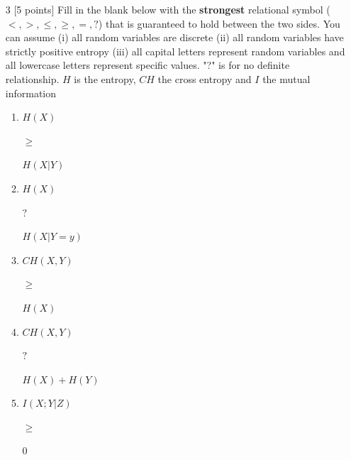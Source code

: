 \documentclass[11pt]{article}
\numberwithin{equation}{section} %
\numberwithin{figure}{section} %
\numberwithin{table}{section} %
\begin{document}
\begin{enumerate}
    \item[3] [5 points] Fill in the blank below with the \textbf{strongest} relational symbol ($<, >, \le, \ge, =, ?$) that is guaranteed to hold between the two sides. You can assume (i) all random variables are discrete (ii) all random variables have strictly positive entropy (iii) all capital letters represent random variables and all lowercase letters represent specific values. "?" is for no definite relationship. $H$ is the entropy, $CH$ the cross entropy and $I$ the mutual information\\
    \begin{enumerate}
        \item $H(X)$  \begin{tcolorbox}[fit,height=0.7cm, width=0.7cm, blank, borderline={1pt}{-2pt}, nobeforeafter]
        \begin{center}\huge$\ge$\end{center}
        \end{tcolorbox} $H(X|Y)$
        \item $H(X)$ \begin{tcolorbox}[fit,height=0.7cm, width=0.7cm, blank, borderline={1pt}{-2pt}, nobeforeafter]
        \begin{center}\huge$?$\end{center}
        \end{tcolorbox} $H(X|Y=y)$
        \item $CH(X, Y)$ \begin{tcolorbox}[fit,height=0.7cm, width=0.7cm, blank, borderline={1pt}{-2pt}, nobeforeafter]
        \begin{center}\huge$\ge$\end{center}
        \end{tcolorbox} $H(X)$
        \item $CH(X,Y)$ \begin{tcolorbox}[fit,height=0.7cm, width=0.7cm, blank, borderline={1pt}{-2pt}, nobeforeafter]
        \begin{center}\huge$?$\end{center}
        \end{tcolorbox} $H(X) + H(Y)$
        \item $I(X;Y|Z)$ \begin{tcolorbox}[fit,height=0.7cm, width=0.7cm, blank, borderline={1pt}{-2pt}, nobeforeafter]
        \begin{center}\huge$\ge$\end{center}
        \end{tcolorbox} $0$
    \end{enumerate}
    

\end{enumerate}
\end{document}
